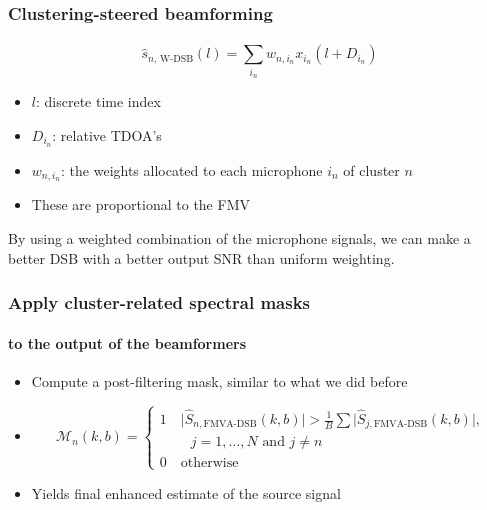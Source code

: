 \documentclass[aspectratio=169]{beamer}
\begin{document}
\begin{frame}
    \frametitle{Clustering-steered beamforming}
    \framesubtitle{}
     \begin{equation*}
        \hat{s}_{n \text{, W-DSB}}(l) = \sum_{i_n}w_{n,i_n}x_{i_n}(l + D_{i_n})
    \end{equation*}
      \begin{itemize}

        \item  $l$: discrete time index
        \item   $D_{i_n}$: relative TDOA's
        \item $w_{n,i_n}$: the weights allocated to each microphone $i_n$ of cluster $n$
        \item These are proportional to the FMV


        \end{itemize}
        By using a weighted combination of the microphone signals, we can make a better DSB with a better output SNR than uniform weighting.
    
\end{frame}

\begin{frame}
    \frametitle{Apply cluster-related spectral masks }
    \framesubtitle{to the output of the beamformers}
      \begin{itemize}
      \item Compute a post-filtering mask, similar to what we did before
      \item
            \begin{equation}
                \mathscr{M}_n(k,b) = \begin{cases} 
            1 \quad \vert \hat S_{n, \text{FMVA-DSB}}(k,b)\vert
            > \frac 1 B \sum \vert \hat S_{j, \text{FMVA-DSB}}(k,b)\vert, \\\ 
            \quad \quad j = 1, \dots ,N \text{ and } j \neq n
            
            \\
            0 \quad \text{otherwise}
            
            \end{cases}
            \end{equation}
      \item Yields final enhanced estimate of the source signal
      
        
    \end{itemize}
   
\end{frame}
\end{document}
